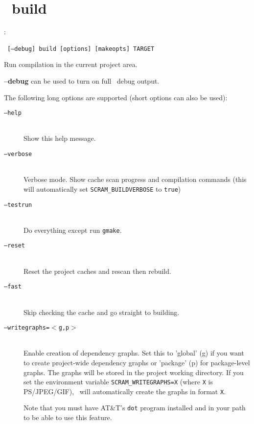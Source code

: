 %
%

\section{\scram\ build}

\cmdintro:

\hspace{5mm}\scram~\texttt{[--debug]}~\texttt{build}~\texttt{[options]}~\texttt{[makeopts]}~\texttt{TARGET}

\ni Run compilation in the current project area.

\textbf{--debug} can be used to turn on full \scram\ debug output.

The following long options are supported (short options can also be used):
\begin{description}
\item[\texttt{--help}]\mbox{}\\
  Show this help message.
\item[\texttt{--verbose}]\mbox{}\\            
  Verbose mode. Show cache scan progress and compilation commands
  (this will automatically set \texttt{SCRAM\_BUILDVERBOSE} to \texttt{true})
\item[\texttt{--testrun}]\mbox{}\\            
  Do everything except run \texttt{gmake}.
\item[\texttt{--reset}]\mbox{}\\              
  Reset the project caches and rescan then rebuild.
\item[\texttt{--fast}]\mbox{}\\               
  Skip checking the cache and go straight to building.
\item[\texttt{--writegraphs=$<$g,p$>$}]\mbox{}\\  
  Enable creation of dependency graphs. Set this to 'global' (g) if you
  want to create project-wide dependency graphs or 'package' (p) for
  package-level graphs. The graphs will be stored in the project working
  directory. If you set the environment variable \texttt{SCRAM\_WRITEGRAPHS=X}
  (where \texttt{X} is PS/JPEG/GIF), \scram\ will automatically create the graphs in format \texttt{X}.
  
  Note that you must have AT\&T's \texttt{dot} program installed and in
  your path to be able to use this feature.
  
\end{description}

